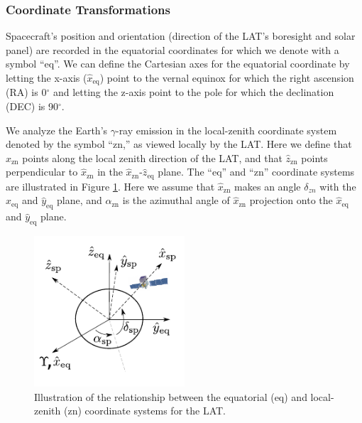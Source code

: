 \subsubsection{Coordinate Transformations}

Spacecraft's position and orientation (direction of the
LAT's boresight and solar panel) are recorded in the equatorial
coordinates for which we denote with a symbol ``eq''. We can define
the Cartesian axes for the equatorial coordinate by letting the
x-axis ($\hat{x}_\text{eq}$) point to the vernal equinox for which the right
ascension (RA) is 0$^\circ$ and letting the z-axis point to the
pole for which the declination (DEC) is 90$^\circ$.

We analyze the Earth's $\gamma$-ray emission in the local-zenith
coordinate system denoted by the symbol ``zn,'' as viewed locally
by the LAT.  Here we define that $\hat{x}_\text{zn}$
points along the local
zenith direction of the LAT, and that $\hat{z}_\text{zn}$
points perpendicular
to $\hat{x}_\text{zn}$ in the $\hat{x}_\text{zn}$-$\hat{z}_\text{eq}$
plane. The ``eq'' and ``zn''
coordinate systems are illustrated in Figure \ref{fig:coord_eq_sp}.
Here we assume that $\hat{x}_\text{zn}$ makes an angle 
$\delta_{zn}$ with
the $\hat{x}_\text{eq}$ and $\hat{y}_\text{eq}$ plane,
and $\alpha_\text{zn}$ is the azimuthal
angle of $\hat{x}_\text{zn}$ projection onto
the $\hat{x}_\text{eq}$ and $\hat{y}_\text{eq}$ plane.

\begin{figure}[h!]
    \centering
    \includegraphics[width=0.5\textwidth]{content/methodology/figures/coord_eq_sp.pdf}
    \caption{
        Illustration of the relationship between the equatorial (eq)
        and local-zenith (zn) coordinate systems for the LAT.
    }
    \label{fig:coord_eq_sp}
\end{figure}


